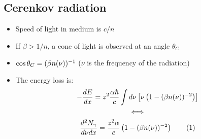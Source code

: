 \subsection{Cerenkov radiation}
\begin{itemize}
  \item Speed of light in medium is $c/n$
  \item If $\beta>1/n$, a cone of light is observed at an angle $\theta_C$
  \item $\cos\theta_C = (\beta n(\nu))^{-1}$ ($\nu$ is the frequency of the radiation)
  \item The energy loss is:
  \begin{gather*}
    - \dd{E}{x} = z^2 \frac{\alpha \hbar}{c} \int d\nu \left[\nu \left(1-(\beta n(\nu))^{-2}\right) \right]\\
    \Longleftrightarrow \\
    \frac{d^2N_\gamma}{d\nu dx} = \frac{z^2\alpha}{c}\left(1-(\beta n(\nu))^{-2}\right) \numberthis
  \end{gather*}
\end{itemize}

